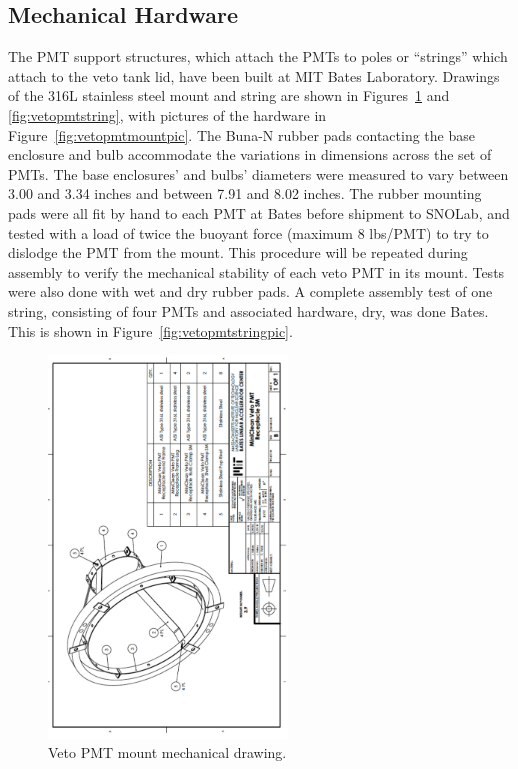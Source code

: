 \documentclass[preprint,12pt]{elsarticle}
\begin{document}
\subsection{Mechanical Hardware}
%
The PMT support structures, which attach the PMTs to poles or
``strings'' which attach to the veto tank lid, have been built at
MIT Bates Laboratory. Drawings of the 316L stainless steel
mount and string are shown in Figures~\ref{fig:vetopmtmount} and
\ref{fig:vetopmtstring}, with pictures of the hardware in
Figure~\ref{fig:vetopmtmountpic}. The Buna-N rubber pads contacting
the base enclosure and bulb accommodate the variations in dimensions
across the set of PMTs. The base enclosures' and bulbs' diameters were
measured to vary between 3.00 and 3.34 inches and between 7.91 and
8.02 inches. The rubber mounting pads were all fit by hand to each PMT
at Bates before shipment to SNOLab, and tested with a load of twice
the buoyant force (maximum 8 lbs/PMT) to try to dislodge the PMT from
the mount.  This procedure will be repeated during assembly to verify
the mechanical stability of each veto PMT in its mount.  Tests were
also done with wet and dry rubber pads.  A complete assembly test of
one string, consisting of four PMTs and associated hardware, dry, was done
Bates.  This is shown in Figure~\ref{fig:vetopmtstringpic}.

\begin{figure}[h]
\begin{center}
\includegraphics[width=2.5in,angle=270]{graphics/vetopmtmount.pdf}
\caption{Veto PMT mount mechanical drawing.
\label{fig:vetopmtmount}}
\end{center}
\end{figure}
\end{document}
